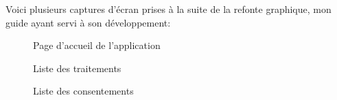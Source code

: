 \documentclass[12pt, a4paper]{report}
\begin{document}
Voici plusieurs captures d'écran prises à la suite de la refonte graphique, mon guide ayant servi à son développement:
\begin{figure}[H]
    \begin{center}
    \end{center}
    \caption{Page d'accueil de l'application}
\end{figure}
\begin{figure}[H]
    \begin{center}
    \end{center}
    \caption{Liste des traitements}
\end{figure}
\begin{figure}[H]
    \begin{center}
    \end{center}
    \caption{Liste des consentements}
\end{figure}
\end{document}
